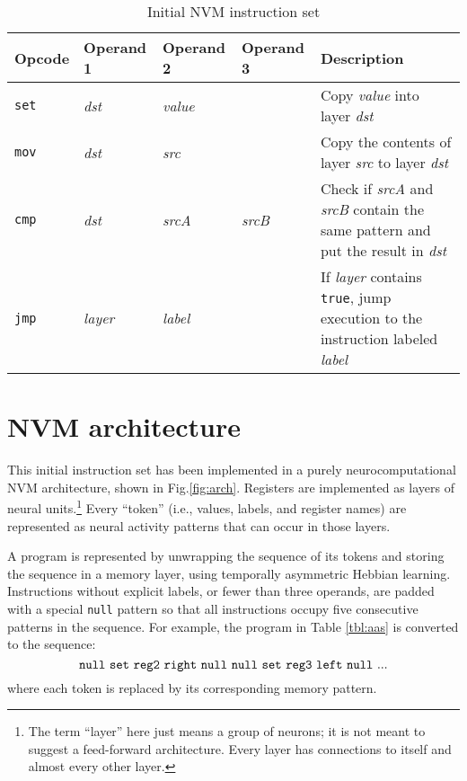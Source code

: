 \documentclass[pdftex,12pt,letterpaper]{article}
\begin{document}
\begin{table}[H]
\begin{tabularx}{\textwidth}{llllX}
Opcode & Operand 1 & Operand 2 & Operand 3 & Description \\
\hline
\texttt{set} & \textit{dst} & \textit{value} & & Copy \textit{value} into layer \textit{dst} \\
\texttt{mov} & \textit{dst} & \textit{src} & & Copy the contents of layer \textit{src} to layer \textit{dst} \\
\texttt{cmp} & \textit{dst} & \textit{srcA} & \textit{srcB} & Check if \textit{srcA} and \textit{srcB} contain the same pattern and put the result in \textit{dst} \\
\texttt{jmp} & \textit{layer} & \textit{label} & & If \textit{layer} contains \texttt{true}, jump execution to the instruction labeled \textit{label} \\
\end{tabularx}
\caption{Initial NVM instruction set}
\label{tbl:inst}
\end{table}

\section{NVM architecture}

This initial instruction set has been implemented in a purely neurocomputational NVM architecture, shown in Fig.\@ \ref{fig:arch}.  Registers are implemented as layers of neural units.\footnote{The term ``layer'' here just means a group of neurons; it is not meant to suggest a feed-forward architecture.  Every layer has connections to itself and almost every other layer.}  Every ``token'' (i.e., values, labels, and register names) are represented as neural activity patterns that can occur in those layers.

A program is represented by unwrapping the sequence of its tokens and storing the sequence in a memory layer, using temporally asymmetric Hebbian learning.  Instructions without explicit labels, or fewer than three operands, are padded with a special \texttt{null} pattern so that all instructions occupy five consecutive patterns in the sequence.  For example, the program in Table \ref{tbl:aas} is converted to the sequence:
\[ \text{\texttt{null} \texttt{set} \texttt{reg2} \texttt{right} \texttt{null} \texttt{null} \texttt{set} \texttt{reg3} \texttt{left} \texttt{null} ...} \]
where each token is replaced by its corresponding memory pattern.
\end{document}
